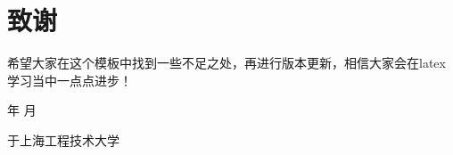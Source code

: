 \chapter*{致谢}
\pagestyle{plain}
希望大家在这个模板中找到一些不足之处，再进行版本更新，相信大家会在latex学习当中一点点进步！

\vspace{0.56\textheight}

\begin{flushright}
    \number\year  年 \number\month  月

    于上海工程技术大学
\end{flushright}
